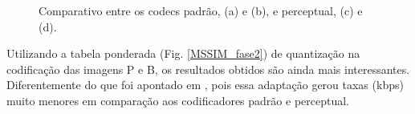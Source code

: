\begin{figure}[!ht]
\caption{Comparativo entre os codecs padrão, (a) e (b), e perceptual, (c) e (d).}
\label{comp_visual}
\end{figure}

\newpage

Utilizando a tabela ponderada (Fig. \ref{MSSIM_fase2}) de quantização na codificação das imagens P e B, os resultados obtidos são ainda mais interessantes. Diferentemente do que foi apontado em \cite{ghanbari2003standard}, pois essa adaptação gerou taxas (kbps) muito menores em comparação aos codificadores padrão e perceptual.

